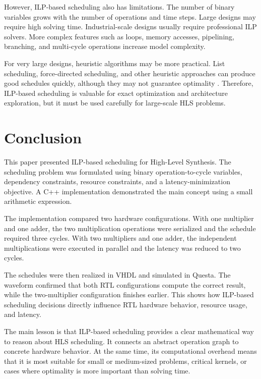 \documentclass[conference]{IEEEtran}
\begin{document}
	However, ILP-based scheduling also has limitations. The number of binary variables grows with the number of operations and time steps. Large designs may require high solving time. Industrial-scale designs usually require professional ILP solvers. More complex features such as loops, memory accesses, pipelining, branching, and multi-cycle operations increase model complexity.
	
	For very large designs, heuristic algorithms may be more practical. List scheduling, force-directed scheduling, and other heuristic approaches can produce good schedules quickly, although they may not guarantee optimality \cite{demicheli,paulin}. Therefore, ILP-based scheduling is valuable for exact optimization and architecture exploration, but it must be used carefully for large-scale HLS problems.
	
	\section{Conclusion}
	
	This paper presented ILP-based scheduling for High-Level Synthesis. The scheduling problem was formulated using binary operation-to-cycle variables, dependency constraints, resource constraints, and a latency-minimization objective. A C++ implementation demonstrated the main concept using a small arithmetic expression.
	
	The implementation compared two hardware configurations. With one multiplier and one adder, the two multiplication operations were serialized and the schedule required three cycles. With two multipliers and one adder, the independent multiplications were executed in parallel and the latency was reduced to two cycles.
	
	The schedules were then realized in VHDL and simulated in Questa. The waveform confirmed that both RTL configurations compute the correct result, while the two-multiplier configuration finishes earlier. This shows how ILP-based scheduling decisions directly influence RTL hardware behavior, resource usage, and latency.
	
	The main lesson is that ILP-based scheduling provides a clear mathematical way to reason about HLS scheduling. It connects an abstract operation graph to concrete hardware behavior. At the same time, its computational overhead means that it is most suitable for small or medium-sized problems, critical kernels, or cases where optimality is more important than solving time.
	
\end{document}
